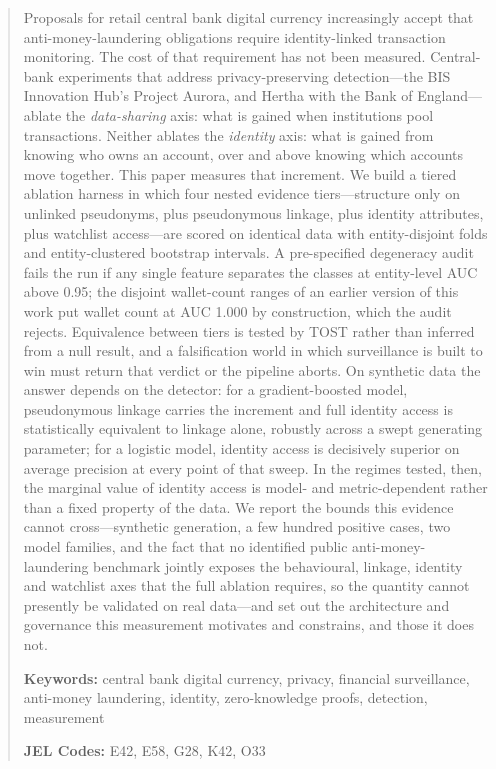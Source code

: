 \documentclass[11pt]{article}
\begin{document}
\begin{abstract}
\noindent Proposals for retail central bank digital currency increasingly accept that
anti-money-laundering obligations require identity-linked transaction monitoring. The cost of that
requirement has not been measured. Central-bank experiments that address privacy-preserving
detection---the BIS Innovation Hub's Project Aurora, and Hertha with the Bank of England---ablate the
\emph{data-sharing} axis: what is gained when institutions pool transactions. Neither ablates the
\emph{identity} axis: what is gained from knowing who owns an account, over and above knowing which
accounts move together. This paper measures that increment. We build a tiered ablation harness in
which four nested evidence tiers---structure only on unlinked pseudonyms, plus pseudonymous linkage,
plus identity attributes, plus watchlist access---are scored on identical data with entity-disjoint
folds and entity-clustered bootstrap intervals. A pre-specified degeneracy audit fails the run if any
single feature separates the classes at entity-level AUC above 0.95; the disjoint wallet-count ranges
of an earlier version of this work put wallet count at AUC 1.000 by construction, which the audit
rejects. Equivalence between
tiers is tested by TOST rather than inferred from a null result, and a falsification world in which
surveillance is built to win must return that verdict or the pipeline aborts. On synthetic data the
answer depends on the detector: for a gradient-boosted model, pseudonymous linkage carries the
increment and full identity access is statistically equivalent to linkage alone, robustly across a
swept generating parameter; for a logistic model, identity access is decisively superior on average
precision at every point of that sweep. In the regimes tested, then, the marginal value of identity
access is model- and metric-dependent rather than a fixed property of the data. We report the
bounds this evidence cannot cross---synthetic generation, a few hundred positive cases, two model
families, and the fact that no identified public anti-money-laundering benchmark jointly exposes the
behavioural, linkage, identity and watchlist axes that the full ablation requires, so the quantity
cannot presently be validated on real data---and set out the architecture and governance this
measurement motivates and constrains, and those it does not.

\vspace{0.5em}
\noindent\textbf{Keywords:} central bank digital currency, privacy, financial surveillance,
anti-money laundering, identity, zero-knowledge proofs, detection, measurement

\vspace{0.3em}
\noindent\textbf{JEL Codes:} E42, E58, G28, K42, O33
\end{abstract}
\end{document}
